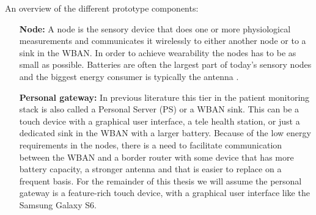 An overview of the different prototype components:
\begin{itemize}

  \item[\textbf{Node:}] A node is the sensory device that does one or more physiological measurements and communicates it wirelessly to either another node or to a sink in the WBAN. In order to achieve wearability the nodes has to be as small as possible. Batteries are often the largest part of today’s sensory nodes and the biggest energy consumer is typically the antenna \cite{Ullah:2010ci}.


  \item[\textbf{Personal gateway:}] In previous literature this tier in the patient monitoring stack is also called a Personal Server (PS) or a WBAN sink. This can be a touch device with a graphical user interface, a tele health station, or just a dedicated sink in the WBAN with a larger battery. Because of the low energy requirements in the nodes, there is a need to facilitate communication between the WBAN and a border router with some device that has more battery capacity, a stronger antenna and that is easier to replace on a frequent basis. For the remainder of this thesis we will assume the personal gateway is a feature-rich touch device, with a graphical user interface like the Samsung Galaxy S6.



\end{itemize}
